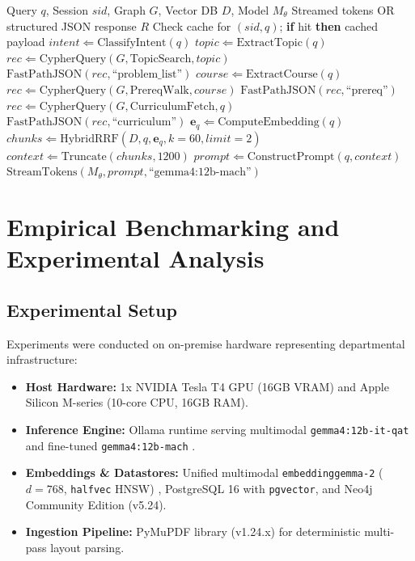 \documentclass[conference]{IEEEtran}
\begin{document}
\begin{algorithm}[htbp]
\caption{Tiered Dual-Channel Retrieval and Fast-Path Engine}
\label{alg:routing}
\begin{algorithmic}[1]
\REQUIRE Query $q$, Session $sid$, Graph $G$, Vector DB $D$, Model $M_{\theta}$
\ENSURE Streamed tokens OR structured JSON response $R$
\STATE Check cache for $(sid, q)$; \textbf{if} hit \textbf{then} \RETURN cached payload
\STATE $intent \Leftarrow \text{ClassifyIntent}(q)$
    \STATE $topic \Leftarrow \text{ExtractTopic}(q)$
    \STATE $rec \Leftarrow \text{CypherQuery}(G, \text{TopicSearch}, topic)$
    \RETURN $\text{FastPathJSON}(rec, \text{``problem\_list''})$
    \STATE $course \Leftarrow \text{ExtractCourse}(q)$
    \STATE $rec \Leftarrow \text{CypherQuery}(G, \text{PrereqWalk}, course)$
    \RETURN $\text{FastPathJSON}(rec, \text{``prereq''})$
    \STATE $rec \Leftarrow \text{CypherQuery}(G, \text{CurriculumFetch}, q)$
    \RETURN $\text{FastPathJSON}(rec, \text{``curriculum''})$
\ELSE
    \STATE $\mathbf{e}_q \Leftarrow \text{ComputeEmbedding}(q)$
    \STATE $chunks \Leftarrow \text{HybridRRF}(D, q, \mathbf{e}_q, k=60, limit=2)$
    \STATE $context \Leftarrow \text{Truncate}(chunks, 1200)$
    \STATE $prompt \Leftarrow \text{ConstructPrompt}(q, context)$
    \RETURN $\text{StreamTokens}(M_{\theta}, prompt, \text{``gemma4:12b-mach''})$
\ENDIF
\end{algorithmic}
\end{algorithm}

\section{Empirical Benchmarking and Experimental Analysis}

\subsection{Experimental Setup}
Experiments were conducted on on-premise hardware representing departmental infrastructure:
\begin{itemize}
    \item \textbf{Host Hardware:} 1x NVIDIA Tesla T4 GPU (16GB VRAM) and Apple Silicon M-series (10-core CPU, 16GB RAM).
    \item \textbf{Inference Engine:} Ollama runtime serving multimodal \texttt{gemma4:12b-it-qat} and fine-tuned \texttt{gemma4:12b-mach} \cite{gemma2026technical}.
    \item \textbf{Embeddings \& Datastores:} Unified multimodal \texttt{embeddinggemma-2} ($d=768$, \texttt{halfvec} HNSW) \cite{embeddinggemma2025}, PostgreSQL 16 with \texttt{pgvector}, and Neo4j Community Edition (v5.24).
    \item \textbf{Ingestion Pipeline:} PyMuPDF library (v1.24.x) for deterministic multi-pass layout parsing.
\end{itemize}
\end{document}
